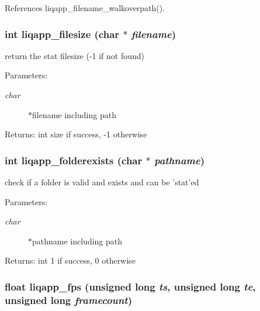 References liqapp\_\-filename\_\-walkoverpath().
\subsubsection[{liqapp\_\-filesize}]{\setlength{\rightskip}{0pt plus 5cm}int liqapp\_\-filesize (char $\ast$ {\em filename})}\label{d7/dbc/liqapp_8c_bf95d66a45418fd04496cb31be2989a2}


return the stat filesize (-1 if not found) \begin{Desc}
\item[Parameters:]
\begin{description}
\item[{\em char}]$\ast$filename including path \end{description}
\end{Desc}
\begin{Desc}
\item[Returns:]int size if success, -1 otherwise \end{Desc}
\subsubsection[{liqapp\_\-folderexists}]{\setlength{\rightskip}{0pt plus 5cm}int liqapp\_\-folderexists (char $\ast$ {\em pathname})}\label{d7/dbc/liqapp_8c_41add1cd481b1ef27b2a01890b2e9132}


check if a folder is valid and exists and can be 'stat'ed \begin{Desc}
\item[Parameters:]
\begin{description}
\item[{\em char}]$\ast$pathname including path \end{description}
\end{Desc}
\begin{Desc}
\item[Returns:]int 1 if success, 0 otherwise \end{Desc}
\subsubsection[{liqapp\_\-fps}]{\setlength{\rightskip}{0pt plus 5cm}float liqapp\_\-fps (unsigned long {\em ts}, \/  unsigned long {\em te}, \/  unsigned long {\em framecount})}\label{d7/dbc/liqapp_8c_21524f206eb1233878245354edbc7805}


